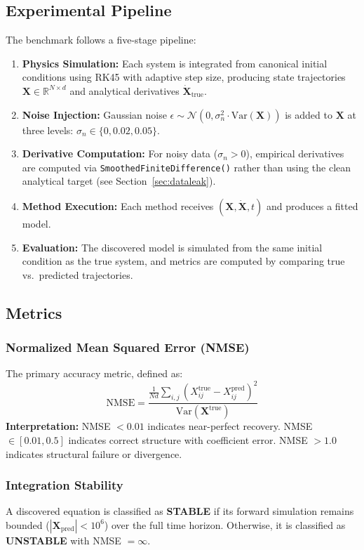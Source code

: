 \documentclass[conference]{IEEEtran}
\begin{document}
\subsection{Experimental Pipeline}
The benchmark follows a five-stage pipeline:
\begin{enumerate}
    \item \textbf{Physics Simulation:} Each system is integrated from canonical initial conditions using RK45 with adaptive step size, producing state trajectories $\mathbf{X} \in \mathbb{R}^{N \times d}$ and analytical derivatives $\dot{\mathbf{X}}_\text{true}$.
    \item \textbf{Noise Injection:} Gaussian noise $\epsilon \sim \mathcal{N}(0, \sigma_n^2 \cdot \text{Var}(\mathbf{X}))$ is added to $\mathbf{X}$ at three levels: $\sigma_n \in \{0, 0.02, 0.05\}$.
    \item \textbf{Derivative Computation:} For noisy data ($\sigma_n > 0$), empirical derivatives are computed via \texttt{SmoothedFiniteDifference()} rather than using the clean analytical target (see Section~\ref{sec:dataleak}).
    \item \textbf{Method Execution:} Each method receives $(\mathbf{X}, \dot{\mathbf{X}}, t)$ and produces a fitted model.
    \item \textbf{Evaluation:} The discovered model is simulated from the same initial condition as the true system, and metrics are computed by comparing true vs.\ predicted trajectories.
\end{enumerate}

\subsection{Metrics}

\subsubsection{Normalized Mean Squared Error (NMSE)}
The primary accuracy metric, defined as:
\begin{equation}
\text{NMSE} = \frac{\frac{1}{Nd}\sum_{i,j}(X_{ij}^\text{true} - X_{ij}^\text{pred})^2}{\text{Var}(\mathbf{X}^\text{true})}
\end{equation}
\textbf{Interpretation:} NMSE $< 0.01$ indicates near-perfect recovery. NMSE $\in [0.01, 0.5]$ indicates correct structure with coefficient error. NMSE $> 1.0$ indicates structural failure or divergence.

\subsubsection{Integration Stability}
A discovered equation is classified as \textbf{STABLE} if its forward simulation remains bounded ($|\mathbf{X}_\text{pred}| < 10^6$) over the full time horizon. Otherwise, it is classified as \textbf{UNSTABLE} with NMSE $= \infty$.
\end{document}
